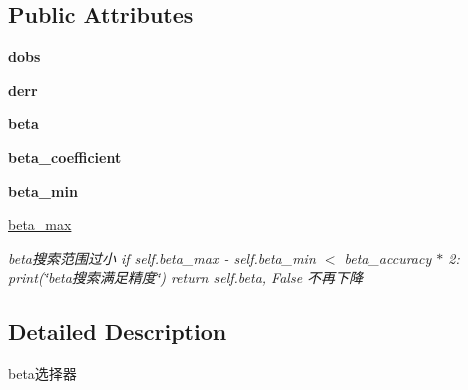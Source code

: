 \subsection*{Public Attributes}
\begin{DoxyCompactItemize}
\item 
\mbox{\label{classMIS_1_1Muon__Imaging__Algorithm_1_1InvDataTools_1_1ByterChooser_1_1ByterChooser_a5056ad4ac5a5bd9fc4be9d92c6598a89}} 
{\bfseries dobs}
\item 
\mbox{\label{classMIS_1_1Muon__Imaging__Algorithm_1_1InvDataTools_1_1ByterChooser_1_1ByterChooser_a40a40cdd03ec87c8c8e24e4be466ca63}} 
{\bfseries derr}
\item 
\mbox{\label{classMIS_1_1Muon__Imaging__Algorithm_1_1InvDataTools_1_1ByterChooser_1_1ByterChooser_a8ff6800efaa89187a4f09387d2a8b638}} 
{\bfseries beta}
\item 
\mbox{\label{classMIS_1_1Muon__Imaging__Algorithm_1_1InvDataTools_1_1ByterChooser_1_1ByterChooser_acb4effaef6d07853021c08c047fe56c6}} 
{\bfseries beta\+\_\+coefficient}
\item 
\mbox{\label{classMIS_1_1Muon__Imaging__Algorithm_1_1InvDataTools_1_1ByterChooser_1_1ByterChooser_a6b4469125627ebbe34d76f7f1988db00}} 
{\bfseries beta\+\_\+min}
\item 
\hyperlink{classMIS_1_1Muon__Imaging__Algorithm_1_1InvDataTools_1_1ByterChooser_1_1ByterChooser_ae8ffeb4938883701926cbd6cbf74c4ac}{beta\+\_\+max}
\begin{DoxyCompactList}\small\item\em beta搜索范围过小 if self.\+beta\+\_\+max -\/ self.\+beta\+\_\+min $<$ beta\+\_\+accuracy $\ast$ 2\+: print(\char`\"{}beta搜索满足精度\char`\"{}) return self.\+beta, False 不再下降 \end{DoxyCompactList}\end{DoxyCompactItemize}


\subsection{Detailed Description}
\begin{DoxyVerb}beta选择器\end{DoxyVerb}
 

